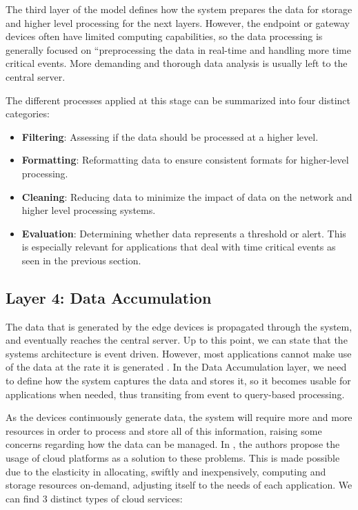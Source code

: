 The third layer of the model defines how the system prepares the data for storage and higher level processing for the next layers. However, the endpoint or gateway devices often have limited computing capabilities, so the data processing is generally focused on ``preprocessing the data in real-time and handling more time critical events. More demanding and thorough data analysis is usually left to the central server. \bigskip

The different processes applied at this stage can be summarized into four distinct categories:

\begin{itemize}
    \item \textbf{Filtering}: Assessing if the data should be processed at a higher level. 
    \item \textbf{Formatting}: Reformatting data to ensure consistent formats for higher-level processing.
    \item \textbf{Cleaning}: Reducing data to minimize the impact of data on the network and higher level processing systems.
    \item \textbf{Evaluation}: Determining whether data represents a threshold or alert. This is especially relevant for applications that deal with time critical events as seen in the previous section.
\end{itemize}


\subsection{Layer 4: Data Accumulation}
\label{sec:iot-model-layer4}

The data that is generated by the edge devices is propagated through the system, and eventually reaches the central server. Up to this point, we can state that the systems architecture is event driven. However, most applications cannot make use of the data at the rate it is generated \cite{10.5555/3161403}. In the Data Accumulation layer, we need to define how the system captures the data and stores it, so it becomes usable for applications when needed, thus transiting from event to query-based processing. \bigskip

As the devices continuously generate data, the system will require more and more resources in order to process and store all of this information, raising some concerns regarding how the data can be managed. In \cite{Doukas2012}, the authors propose the usage of cloud platforms as a solution to these problems. This is made possible due to the elasticity in allocating, swiftly and inexpensively, computing and storage resources on-demand, adjusting itself to the needs of each application. We can find 3 distinct types of cloud services: %


